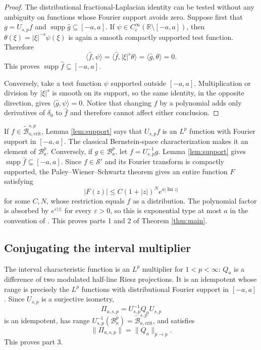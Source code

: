 \documentclass[11pt]{article}
\newcommand{\R}{\mathbb R}
\newcommand{\cS}{\mathcal S}
\newcommand{\supp}{\operatorname{supp}}
\newcommand{\crit}{\mathrm{crit}}
\begin{document}
\begin{proof}
The distributional fractional-Laplacian identity can be tested without any
ambiguity on functions whose Fourier support avoids zero. Suppose first that
$g=U_{s,p}f$ and $\supp\widehat g\subseteq[-a,a]$. If
$\psi\in C_c^\infty(\R\setminus[-a,a])$, then
$\theta(\xi)=|\xi|^{-s}\psi(\xi)$ is again a smooth compactly supported test
function. Therefore
\[
 \langle\widehat f,\psi\rangle
 =\langle\widehat f,|\xi|^s\theta\rangle
 =\langle\widehat g,\theta\rangle=0.
\]
This proves $\supp\widehat f\subseteq[-a,a]$.

Conversely, take a test function $\psi$ supported outside $[-a,a]$.
Multiplication or division by $|\xi|^s$ is smooth on its support, so the same
identity, in the opposite direction, gives
$\langle\widehat g,\psi\rangle=0$. Notice that changing $f$ by a polynomial
adds only derivatives of $\delta_0$ to $\widehat f$ and therefore cannot
affect either conclusion.
\end{proof}

If $f\in\widetilde{\mathcal B}^{s,p}_{a,\crit}$, Lemma
\ref{lem:support} says that $U_{s,p}f$ is an $L^p$ function with Fourier
support in $[-a,a]$. The classical Bernstein-space characterization makes it
an element of $\mathcal B_a^p$. Conversely, if $g\in\mathcal B_a^p$, let
$f=U_{s,p}^{-1}g$. Lemma \ref{lem:support} gives
$\supp\widehat f\subseteq[-a,a]$. Since $f\in\cS'$ and its Fourier
transform is compactly supported, the Paley--Wiener--Schwartz theorem gives
an entire function $F$ satisfying
\[
 |F(z)|\leq C(1+|z|)^N e^{a|\operatorname{Im}z|}
\]
for some $C,N$, whose restriction equals $f$ as a distribution. The
polynomial factor is absorbed by $e^{\varepsilon|z|}$ for every
$\varepsilon>0$, so this is exponential type at most $a$ in the convention
of \cite{MPSPW}. This proves parts 1 and 2 of Theorem \ref{thm:main}.

\subsection{Conjugating the interval multiplier}

The interval characteristic function is an $L^p$ multiplier for
$1<p<\infty$: $Q_a$ is a difference of two modulated half-line Riesz
projections. It is an idempotent whose range is precisely the $L^p$ functions
with distributional Fourier support in $[-a,a]$. Since $U_{s,p}$ is a
surjective isometry,
\[
 \Pi_{a,s,p}=U_{s,p}^{-1}Q_aU_{s,p}
\]
is an idempotent, has range
$U_{s,p}^{-1}(\mathcal B_a^p)=
\widetilde{\mathcal B}^{s,p}_{a,\crit}$, and satisfies
\[
 \|\Pi_{a,s,p}\|=\|Q_a\|_{p\to p}.
\]
This proves part 3.
\end{document}
